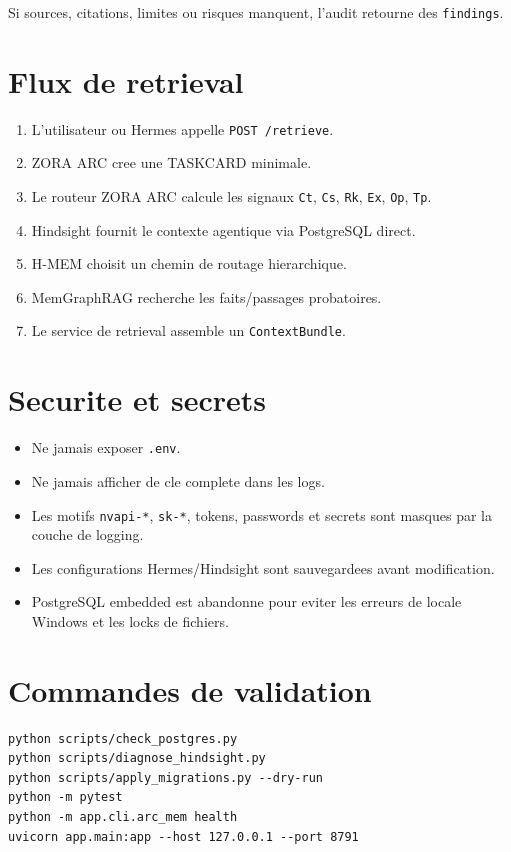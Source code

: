 \documentclass[11pt,a4paper]{article}
\begin{document}
Si sources, citations, limites ou risques manquent, l'audit retourne des
\texttt{findings}.

\section{Flux de retrieval}

\begin{enumerate}[leftmargin=*]
  \item L'utilisateur ou Hermes appelle \texttt{POST /retrieve}.
  \item ZORA ARC cree une TASKCARD minimale.
  \item Le routeur ZORA ARC calcule les signaux \texttt{Ct}, \texttt{Cs},
  \texttt{Rk}, \texttt{Ex}, \texttt{Op}, \texttt{Tp}.
  \item Hindsight fournit le contexte agentique via PostgreSQL direct.
  \item H-MEM choisit un chemin de routage hierarchique.
  \item MemGraphRAG recherche les faits/passages probatoires.
  \item Le service de retrieval assemble un \texttt{ContextBundle}.
\end{enumerate}

\section{Securite et secrets}

\begin{itemize}[leftmargin=*]
  \item Ne jamais exposer \texttt{.env}.
  \item Ne jamais afficher de cle complete dans les logs.
  \item Les motifs \texttt{nvapi-*}, \texttt{sk-*}, tokens, passwords et secrets
  sont masques par la couche de logging.
  \item Les configurations Hermes/Hindsight sont sauvegardees avant modification.
  \item PostgreSQL embedded est abandonne pour eviter les erreurs de locale
  Windows et les locks de fichiers.
\end{itemize}

\section{Commandes de validation}

\begin{lstlisting}
python scripts/check_postgres.py
python scripts/diagnose_hindsight.py
python scripts/apply_migrations.py --dry-run
python -m pytest
python -m app.cli.arc_mem health
uvicorn app.main:app --host 127.0.0.1 --port 8791
\end{lstlisting}
\end{document}
